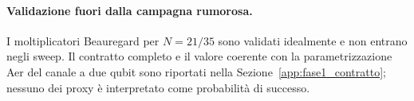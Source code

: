 \begin{onehalfspace}
\paragraph{Validazione fuori dalla campagna rumorosa.}
I moltiplicatori Beauregard per $N=21/35$ sono validati idealmente e non
entrano negli sweep. Il contratto completo e il valore coerente con la
parametrizzazione Aer del canale a due qubit sono riportati nella
Sezione~\ref{app:fase1_contratto}; nessuno dei proxy è interpretato come
probabilità di successo.

\end{onehalfspace}
